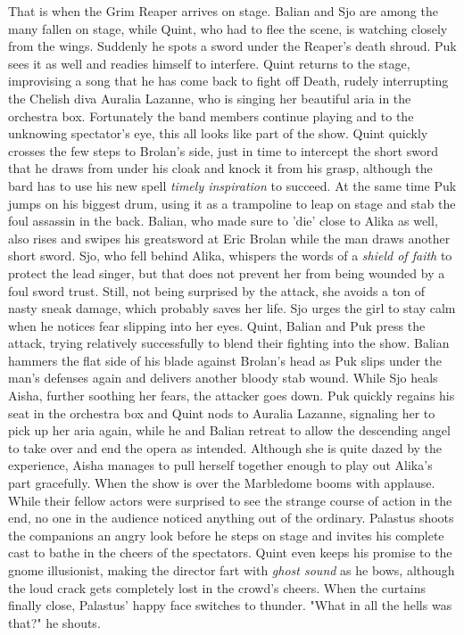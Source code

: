That is when the Grim Reaper arrives on stage. Balian and Sjo are among the many fallen on stage, while Quint, who had to flee the scene, is watching closely from the wings. Suddenly he spots a sword under the Reaper's death shroud. Puk sees it as well and readies himself to interfere. Quint returns to the stage, improvising a song that he has come back to fight off Death, rudely interrupting the Chelish diva Auralia Lazanne, who is singing her beautiful aria in the orchestra box. Fortunately the band members continue playing and to the unknowing spectator's eye, this all looks like part of the show. Quint quickly crosses the few steps to Brolan's side, just in time to intercept the short sword that he draws from under his cloak and knock it from his grasp, although the bard has to use his new spell {\itshape timely inspiration} to succeed. At the same time Puk jumps on his biggest drum, using it as a trampoline to leap on stage and stab the foul assassin in the back. Balian, who made sure to 'die' close to Alika as well, also rises and swipes his greatsword at Eric Brolan while the man draws another short sword. Sjo, who fell behind Alika, whispers the words of a  {\itshape shield of faith} to protect the lead singer, but that does not prevent her from being wounded by a foul sword trust. Still, not being surprised by the attack, she avoids a ton of nasty sneak damage, which probably saves her life. Sjo urges the girl to stay calm when he notices fear slipping into her eyes. Quint, Balian and Puk press the attack, trying relatively successfully to blend their fighting into the show. Balian hammers the flat side of his blade against Brolan's head as Puk slips under the man's defenses again and delivers another bloody stab wound. While Sjo heals Aisha, further soothing her fears, the attacker goes down. Puk quickly regains his seat in the orchestra box and Quint nods to Auralia Lazanne, signaling her to pick up her aria again, while he and Balian retreat to allow the descending angel to take over and end the opera as intended. Although she is quite dazed by the experience, Aisha manages to pull herself together enough to play out Alika's part gracefully. When the show is over the Marbledome booms with applause. While their fellow actors were surprised to see the strange course of action in the end, no one in the audience noticed anything out of the ordinary. Palastus shoots the companions an angry look before he steps on stage and invites his complete cast to bathe in the cheers of the spectators. Quint even keeps his promise to the gnome illusionist, making the director fart with {\itshape ghost sound} as he bows, although the loud crack gets completely lost in the crowd's cheers. When the curtains finally close, Palastus' happy face switches to thunder. "What in all the hells was that?" he shouts. 